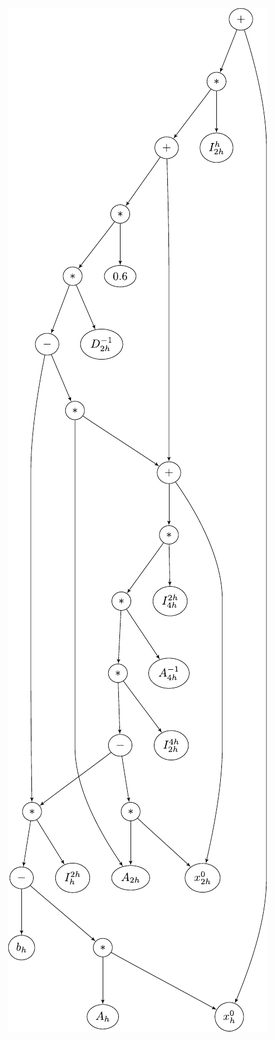 \begin{figure}
	\captionsetup{justification=centering}
	\begin{subfigure}[b]{0.49\textwidth}\centering
		\includegraphics[height=0.925\textheight]{figures/trees/three_grid_method_computational_graph.pdf}

\end{subfigure}
\end{figure}
